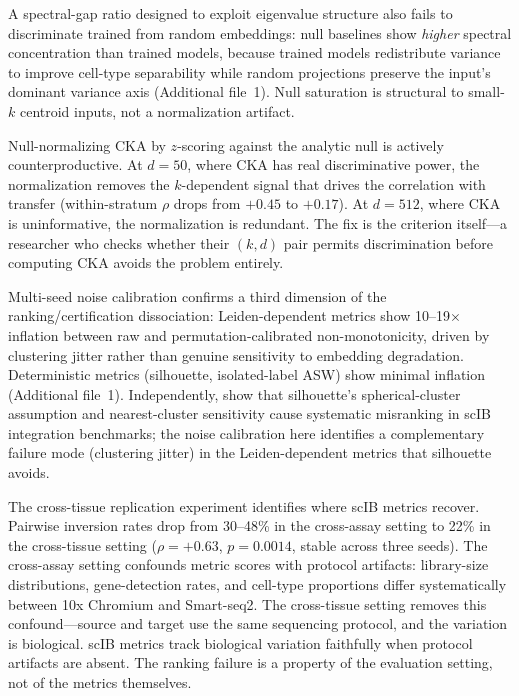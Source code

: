 \documentclass[11pt]{article}
\begin{document}
A spectral-gap ratio designed to exploit eigenvalue structure also
fails to discriminate trained from random embeddings: null baselines
show \emph{higher} spectral concentration than trained models, because
trained models redistribute variance to improve cell-type separability
while random projections preserve the input's dominant variance axis
(Additional file~1). Null saturation is structural to
small-$k$ centroid inputs, not a normalization artifact.

Null-normalizing CKA by $z$-scoring against the analytic null is
actively counterproductive. At $d = 50$, where CKA has real
discriminative power, the normalization removes the $k$-dependent signal
that drives the correlation with transfer (within-stratum $\rho$ drops
from $+0.45$ to $+0.17$). At $d = 512$, where CKA is uninformative,
the normalization is redundant. The fix is the criterion itself---a
researcher who checks whether their $(k, d)$ pair permits discrimination
before computing CKA avoids the problem entirely.

Multi-seed noise calibration confirms a third dimension of the
ranking/certification dissociation: Leiden-dependent metrics show
10--19$\times$ inflation between raw and permutation-calibrated
non-monotonicity, driven by clustering jitter rather than genuine
sensitivity to embedding degradation. Deterministic metrics (silhouette,
isolated-label ASW) show minimal inflation
(Additional file~1). Independently,
\citet{rautenstrauch2025silhouette} show that silhouette's
spherical-cluster assumption and nearest-cluster sensitivity cause
systematic misranking in scIB integration benchmarks; the noise
calibration here identifies a complementary failure mode (clustering
jitter) in the Leiden-dependent metrics that silhouette avoids.

The cross-tissue replication experiment identifies where scIB metrics
recover. Pairwise inversion rates drop from 30--48\% in the cross-assay
setting to 22\% in the cross-tissue setting ($\rho = +0.63$,
$p = 0.0014$, stable across three seeds). The cross-assay setting
confounds metric scores with protocol artifacts: library-size
distributions, gene-detection rates, and cell-type proportions differ
systematically between 10x Chromium and Smart-seq2. The cross-tissue
setting removes this confound---source and target use the same
sequencing protocol, and the variation is biological. scIB metrics track
biological variation faithfully when protocol artifacts are absent. The
ranking failure is a property of the evaluation setting, not of the
metrics themselves.
\end{document}

